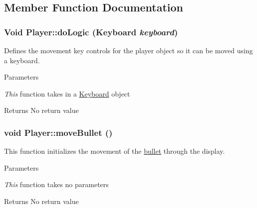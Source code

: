 \subsection{Member Function Documentation}
\hypertarget{classPlayer_addf356ccfe6223db41eb4a06d5661a60}{
\subsubsection[{doLogic}]{\setlength{\rightskip}{0pt plus 5cm}Void Player::doLogic ({\bf Keyboard} {\em keyboard})}}
\label{classPlayer_addf356ccfe6223db41eb4a06d5661a60}


Defines the movement key controls for the player object so it can be moved using a keyboard. 
\begin{DoxyParams}{Parameters}
\item[{\em This}]function takes in a \hyperlink{classKeyboard}{Keyboard} object \end{DoxyParams}
\begin{DoxyReturn}{Returns}
No return value 
\end{DoxyReturn}
\hypertarget{classPlayer_a4c994edd3d4c3b3378501353d73e30cb}{
\subsubsection[{moveBullet}]{\setlength{\rightskip}{0pt plus 5cm}void Player::moveBullet ()}}
\label{classPlayer_a4c994edd3d4c3b3378501353d73e30cb}


This function initializes the movement of the \hyperlink{classbullet}{bullet} through the display. 
\begin{DoxyParams}{Parameters}
\item[{\em This}]function takes no parameters \end{DoxyParams}
\begin{DoxyReturn}{Returns}
No return value 
\end{DoxyReturn}


